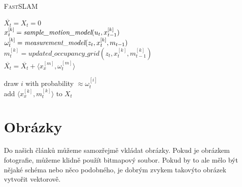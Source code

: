 \documentclass[a4paper, 11pt]{article}
\begin{document}
	\begin{algorithm}
		\caption{\textsc{FastSLAM}}
		\label{algorithm:fastslam}

		\SetNlSty{}{}{:}
		\SetNlSkip{-1em}

		\Indp\Indpp
		\BlankLine

		$ \overline{X_t} = X_t = 0 $ \\

		{
			$ x_t^{[k]} = \emph{sample\_motion\_model}(u_t, x_{t - 1}^{[k]}) $ \\
			$ \omega_t^{[k]} = \emph{measurement\_model}(z_t, x_t^{[k]}, m_{t - 1}) $ \\
			$ m_t^{[k]} = updated\_occupancy\_grid(z_t, x_t^{[k]}, m_{t - 1}^{[k]}) $ \\
			$ \overline{X_t} = \overline{X_t} + \langle x_x^{[m]}, \omega_t^{[m]}  \rangle $ \\
		}

		{
			draw $ i $ with probability $ \approx \omega_t^{[i]} $ \\
			add $ \langle x_x^{[k]}, m_t^{[k]} \rangle \textrm{ to } X_t $ \\
		}

	\end{algorithm}

	\section{Obrázky}
	Do našich článků můžeme samozřejmě vkládat obrázky. Pokud je obrázkem fotografie,
	můžeme klidně použít bitmapový soubor. Pokud by to ale mělo být nějaké schéma nebo
	něco podobného, je dobrým zvykem takovýto obrázek vytvořit vektorově.
\end{document}

